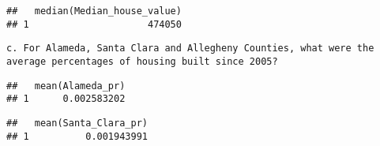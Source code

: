 \documentclass[
]{article}
\newenvironment{Shaded}{\begin{snugshade}}{\end{snugshade}}
\newcommand{\DataTypeTok}[1]{\textcolor[rgb]{0.13,0.29,0.53}{#1}}
\newcommand{\DecValTok}[1]{\textcolor[rgb]{0.00,0.00,0.81}{#1}}
\newcommand{\KeywordTok}[1]{\textcolor[rgb]{0.13,0.29,0.53}{\textbf{#1}}}
\newcommand{\NormalTok}[1]{#1}
\newcommand{\OperatorTok}[1]{\textcolor[rgb]{0.81,0.36,0.00}{\textbf{#1}}}
\newcommand{\StringTok}[1]{\textcolor[rgb]{0.31,0.60,0.02}{#1}}
\begin{document}
\begin{verbatim}
##   median(Median_house_value)
## 1                     474050
\end{verbatim}

\begin{verbatim}
c. For Alameda, Santa Clara and Allegheny Counties, what were the average percentages of housing built since 2005?
\end{verbatim}

\begin{Shaded}
\end{Shaded}

\begin{verbatim}
##   mean(Alameda_pr)
## 1      0.002583202
\end{verbatim}

\begin{Shaded}
\end{Shaded}

\begin{verbatim}
##   mean(Santa_Clara_pr)
## 1          0.001943991
\end{verbatim}

\begin{Shaded}
\end{Shaded}
\end{document}
